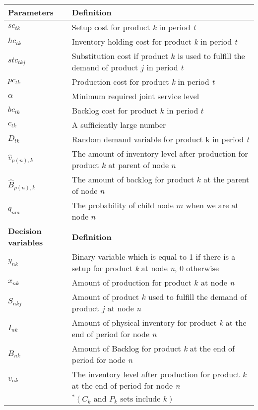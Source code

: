 \documentclass[10pt]{article}
\newcommand{\ti}{t} %
\newcommand{\ka}{k} %
\newcommand{\jey}{j} %
\newcommand{\Bi}{B} %
\newcommand{\Vi}{v} %
\newcommand{\Es}{S} %
\newcommand{\x}{x} %
\newcommand{\y}{y} %
\newcommand{\InvPos}{inventory level after production }
\begin{document}
\begin{table}[H]
\begin{adjustbox}{width=1\textwidth,center=\textwidth}
\begin{tabular}{ll}
{\bf Parameters} & {\bf Definition} \\ \midrule
$sc_{\ti \ka}$ & Setup cost for product {\it k} in period {\it t} \\ 
$hc_{\ti \ka}$  & Inventory holding cost for product {\it k} in period {\it t}  \\ 
$stc_{\ti \ka \jey }$  & Substitution cost if product $\ka$  is used to fulfill the demand of product $j$ in period {\it t}  \\ 
$pc_{\ti \ka}$  & Production cost for product {\it k} in period {\it t}  \\
$\alpha$  & Minimum required joint service level \\ 
$bc_{\ti \ka}$  & Backlog cost for product $\ka$  in period $\ti$ \\
$c_{\ti \ka}$  & A sufficiently large number \\ 
${D}_{\ti \ka}$ & Random demand variable for product {\ka } in period {\it t}  \\ 
$\hat{\Vi}_{p(n), \ka} $&  The amount of \InvPos for product $\ka$ at parent of node  $n$\\
$\hat{\Bi}_{p(n), \ka} $&  The amount of backlog for product $\ka$ at the parent of node $n$  \\
$q_{nm} $&  The probability of child node $m$ when we are at node $n$  \\
{\bf Decision variables} & {\bf Definition} \\ \midrule
$\y_{n \ka}$ & Binary variable which is equal to 1 if there is a setup for product {\it k} at node {\it n}, 0 otherwise \\ 
$\x_{n \ka}$ & Amount of production for product $\ka$  at node {\it n}  \\ 
$\Es_{n \ka \jey}$ & Amount of product $\ka$  used to fulfill the demand of product $\jey$  at  node {\it n}   \\
${I}_{n \ka}$ & Amount of physical inventory for product {\it k} at the end of period for node {\it n}  \\
${\Bi}_{n \ka}$ & Amount of Backlog for product {\it k} at the end of period for node {\it n}  \\
${\Vi}_{n \ka}$ & The \InvPos for product {\it \ka} at the end of period for node {\it n}  \\
 \bottomrule
 & $^*{ (C_k \text{ and } P_k  \text{ sets include } k) }$
\end{tabular}
\end{adjustbox}
 \label{tab:Sub_parameters}
\end{table}
\end{document}
